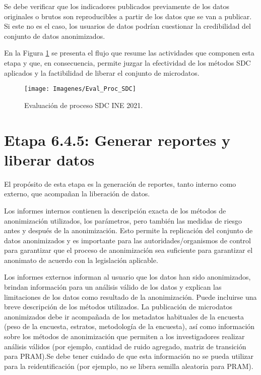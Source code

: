 \documentclass[
]{book}
\theoremstyle{definition}
\theoremstyle{definition}
\theoremstyle{definition}
\theoremstyle{definition}
\theoremstyle{remark}
\begin{document}
Se debe verificar que los indicadores publicados previamente de los datos originales o brutos son reproducibles a partir de los datos que se van a publicar. Si este no es el caso, los usuarios de datos podrían cuestionar la credibilidad del conjunto de datos anonimizados.

En la Figura \ref{fig:evalSDC} se presenta el flujo que resume las actividades que componen esta etapa y que, en consecuencia, permite juzgar la efectividad de los métodos SDC aplicados y la factibilidad de liberar el conjunto de microdatos.

\begin{figure}

{\centering \texttt{[image: Imagenes/Eval\_Proc\_SDC]} 

}

\caption{Evaluación de proceso SDC INE 2021.}\label{fig:evalSDC}
\end{figure}

\hypertarget{etapa-6.4.5-generar-reportes-y-liberar-datos}{%
\section{Etapa 6.4.5: Generar reportes y liberar datos}\label{etapa-6.4.5-generar-reportes-y-liberar-datos}}

El propósito de esta etapa es la generación de reportes, tanto interno como externo, que acompañan la liberación de datos.

Los informes internos contienen la descripción exacta de los métodos de anonimización utilizados, los parámetros, pero también las medidas de riesgo antes y después de la anonimización. Esto permite la replicación del conjunto de datos anonimizados y es importante para las autoridades/organismos de control para garantizar que el proceso de anonimización sea suficiente para garantizar el anonimato de acuerdo con la legislación aplicable.

Los informes externos informan al usuario que los datos han sido anonimizados, brindan información para un análisis válido de los datos y explican las limitaciones de los datos como resultado de la anonimización. Puede incluirse una breve descripción de los métodos utilizados. La publicación de microdatos anonimizados debe ir acompañada de los metadatos habituales de la encuesta (peso de la encuesta, estratos, metodología de la encuesta), así como información sobre los métodos de anonimización que permiten a los investigadores realizar análisis válidos (por ejemplo, cantidad de ruido agregado, matriz de transición para PRAM).Se debe tener cuidado de que esta información no se pueda utilizar para la reidentificación (por ejemplo, no se libera semilla aleatoria para PRAM).
\end{document}
